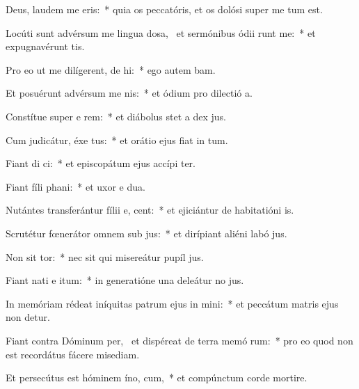 \item Deus, laudem me  eris:~* quia os peccatóris, et os dolósi super me tum est.
\item Locúti sunt advérsum me lingua dosa,~\pscross{} et sermónibus ódii runt me:~* et expugnavérunt  tis.
\item Pro eo ut me dilígerent, de hi:~* ego autem bam.
\item Et posuérunt advérsum me   nis:~* et ódium pro dilectió a.
\item Constítue super e rem:~* et diábolus stet a dex jus.
\item Cum judicátur, éxe tus:~* et orátio ejus fiat in tum.
\item Fiant di  ci:~* et episcopátum ejus accípi ter.
\item Fiant fíli  phani:~* et uxor e dua.
\item Nutántes transferántur fílii e,  cent:~* et ejiciántur de habitatióni is.
\item Scrutétur fœnerátor omnem sub jus:~* et dirípiant aliéni labó jus.
\item Non sit  tor:~* nec sit qui misereátur pupíl jus.
\item Fiant nati e  itum:~* in generatióne una deleátur no jus.
\item In memóriam rédeat iníquitas patrum ejus in  mini:~* et peccátum matris ejus non detur.
\item Fiant contra Dóminum per,~\pscross{} et dispéreat de terra memó rum:~* pro eo quod non est recordátus fácere misediam.
\item Et persecútus est hóminem íno,  cum,~* et compúnctum corde mortire.
